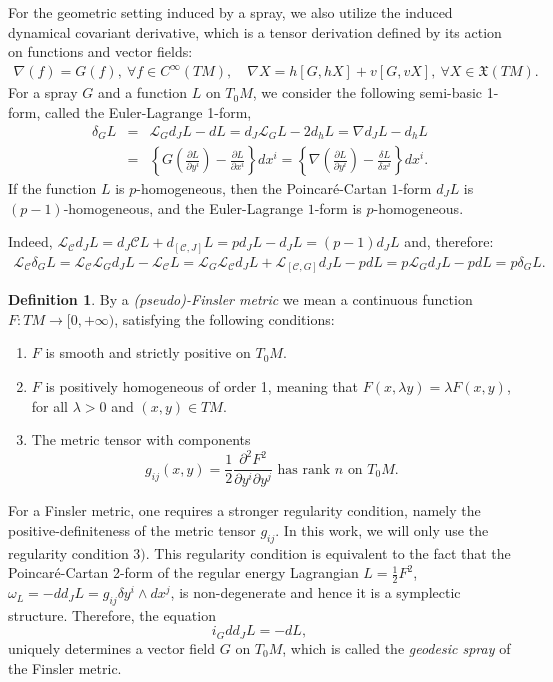 \documentclass[oneside,english]{amsart}
\theoremstyle{definition}
\newtheorem{definition}[theorem]{Definition}
\theoremstyle{plain}
\theoremstyle{plain}
\theoremstyle{plain}
\theoremstyle{remark}
\theoremstyle{remark}
\theoremstyle{remark}
\begin{document}
For the geometric setting induced by a spray, we also utilize the induced dynamical covariant derivative, which is a tensor derivation defined by its action on functions and vector fields:
\begin{eqnarray*}
\nabla(f)=G(f), \ \forall f\in C^{\infty}(TM), \quad \nabla
  X=h[G,hX]+v[G,vX], \ \forall X \in {\mathfrak X}(TM).
\end{eqnarray*}
For a spray $G$ and a function $L$ on $T_0M$, we consider the following semi-basic 1-form, called the Euler-Lagrange 1-form,
\begin{eqnarray}\label{EL}
\delta_GL & = & \mathcal{L}_Gd_JL-dL=d_J\mathcal{L}_GL-2d_hL = \nabla d_JL - d_hL \\ 
& = & \left\{G\left(\frac{\partial L}{\partial y^i}\right) - \frac{\partial L}{\partial x^i}\right\} dx^i = \left\{ \nabla\left(\frac{\partial L}{\partial y^i}\right) - \frac{\delta L}{\delta x^i}\right\} dx^i. \nonumber
\end{eqnarray}
If the function $L$ is $p$-homogeneous, then the Poincar\'e-Cartan $1$-form $d_JL$ is $(p-1)$-homogeneous, and the Euler-Lagrange $1$-form is $p$-homogeneous. 

Indeed, $\mathcal{L}_{\mathcal{C}}d_JL=d_J\mathcal{C}L+d_{[\mathcal{C}, J]}L=pd_JL-d_JL=(p-1)d_JL$ and, therefore: 
\begin{eqnarray*}
\mathcal{L}_{\mathcal{C}}\delta_GL = \mathcal{L}_{\mathcal{C}}\mathcal{L}_{G} d_JL - \mathcal{L}_{\mathcal{C}}L=\mathcal{L}_{G}\mathcal{L}_{\mathcal{C}}d_JL+\mathcal{L}_{[\mathcal{C}, G]}d_JL - pdL = p\mathcal{L}_{G} d_JL - pdL = p\delta_GL. 
\end{eqnarray*} 

\begin{definition}
By a \textit{(pseudo)-Finsler metric} we mean a continuous function $F : TM \rightarrow [0, +\infty)$, satisfying the following conditions:
\begin{enumerate}
\item $F$ is smooth and strictly positive on $T_0M$.
\item $F$ is positively homogeneous of order 1, meaning that $F(x,\lambda y)=\lambda F(x,y)$, for all $\lambda> 0$ and $(x,y)\in TM.$
\item   The metric tensor with components
\[g_{ij}(x,y)=\frac{1}{2}\frac{\partial^2 F^2}{\partial y^i\partial y^j} \text{ has rank $n$ on $T_0M$}.\]
\end{enumerate}
\end{definition}
\noindent For a Finsler metric, one requires a stronger regularity condition, namely the positive-definiteness of the metric tensor $g_{ij}$. In this work, we will only use the regularity condition $3)$.  
This regularity condition is equivalent to the fact that the Poincar\' e-Cartan 2-form of the regular energy Lagrangian $L=\frac{1}{2}F^2$, $\omega_{L} = -dd_JL=g_{ij}\delta y^i\wedge dx^j$, is non-degenerate and hence it is a
symplectic structure. Therefore, the equation
\begin{equation}\label{iGddJ}
i_Gdd_JL=-dL,
\end{equation}
uniquely determines a vector field $G$ on $T_0M$, which is called the \textit{geodesic spray} of the Finsler metric.
\end{document}
